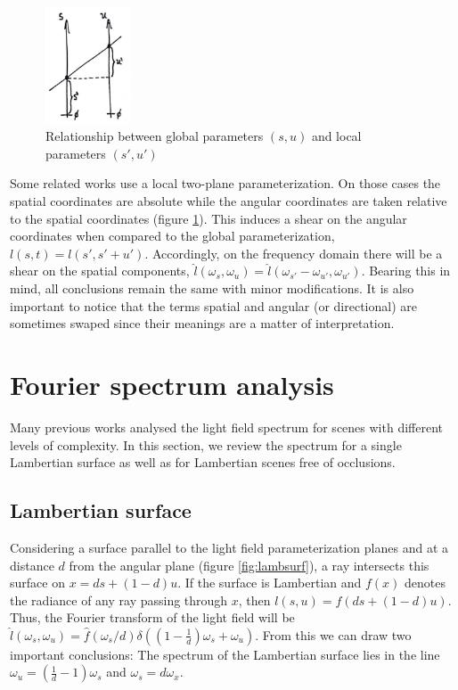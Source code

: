 \documentclass[acmtog,review,anonymous]{acmart}
\begin{document}
\begin{figure}[h]
  \includegraphics[width=1in]{figures/localparam}
  \caption{Relationship between global parameters $(s, u)$ and local parameters $(s', u')$}
  \label{fig:localparam}
\end{figure}

Some related works use a local two-plane parameterization\cite{Chai:2000:PS:344779.344932}. On those cases the spatial coordinates are absolute while the angular coordinates are taken relative to the spatial coordinates (figure \ref{fig:localparam}). This induces a shear on the angular coordinates when compared to the global parameterization, $l(s, t) = l(s', s' + u')$. Accordingly, on the frequency domain there will be a shear on the spatial components, $\hat{l}(\omega_{s}, \omega_{u}) = \hat{l}(\omega_{s'} - \omega_{u'}, \omega_{u'})$. Bearing this in mind, all conclusions remain the same with minor modifications. It is also important to notice that the terms spatial and angular (or directional) are sometimes swaped since their meanings are a matter of interpretation.

\section{Fourier spectrum analysis}

Many previous works analysed the light field spectrum for scenes with different levels of complexity\cite{Liang:2015:LTF:2742222.2665075,Chai:2000:PS:344779.344932,Durand:2005:FAL:1073204.1073320,Ng:2005:FSP:1073204.1073256}. In this section, we review the spectrum for a single Lambertian surface as well as for Lambertian scenes free of occlusions.

\subsection{Lambertian surface} \label{subsec:lambsurf}

Considering a surface parallel to the light field parameterization planes and at a distance $d$ from the angular plane (figure \ref{fig:lambsurf}), a ray intersects this surface on $x = ds + (1-d)u$. If the surface is Lambertian and $f(x)$ denotes the radiance of any ray passing through $x$, then $l(s, u) = f(ds + (1-d)u)$. Thus, the Fourier transform of the light field will be $\hat{l}(\omega_{s},\omega_{u}) = \hat{f}(\omega_{s}/d)\delta((1 - \frac{1}{d})\omega_{s} + \omega_{u})$. From this we can draw two important conclusions: The spectrum of the Lambertian surface lies in the line $\omega_{u} = (\frac{1}{d} - 1)\omega_{s}$ and $\omega_{s} = d\omega_{x}$.
\end{document}
